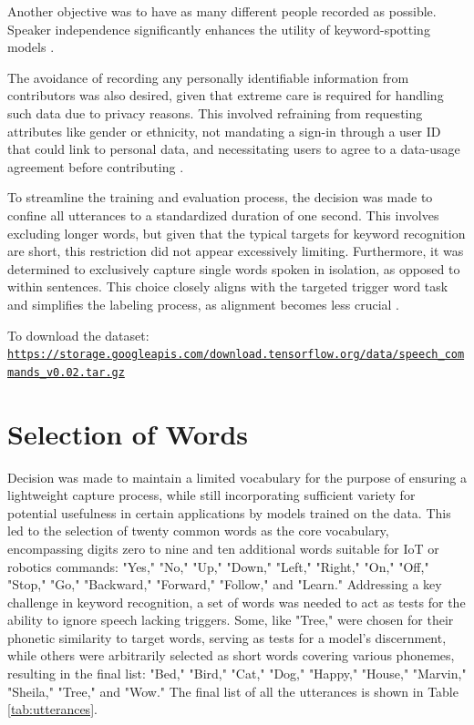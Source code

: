 Another objective was to have as many different people recorded as possible. Speaker independence significantly enhances the utility of keyword-spotting models \cite{Warden:2018}.

The avoidance of recording any personally identifiable information from contributors was also desired, given that extreme care is required for handling such data due to privacy reasons. This involved refraining from requesting attributes like gender or ethnicity, not mandating a sign-in through a user ID that could link to personal data, and necessitating users to agree to a data-usage agreement before contributing \cite{Warden:2018}.

To streamline the training and evaluation process, the decision was made to confine all utterances to a standardized duration of one second. This involves excluding longer words, but given that the typical targets for keyword recognition are short, this restriction did not appear excessively limiting. Furthermore, it was determined to exclusively capture single words spoken in isolation, as opposed to within sentences. This choice closely aligns with the targeted trigger word task and simplifies the labeling process, as alignment becomes less crucial \cite{Warden:2018}.

To download the dataset: \texttt{\url{https://storage.googleapis.com/download.tensorflow.org/data/speech\_commands\_v0.02.tar.gz}}

\section{Selection of Words}

Decision was made to maintain a limited vocabulary for the purpose of ensuring a lightweight capture process, while still incorporating sufficient variety for potential usefulness in certain applications by models trained on the data. This led to the selection of twenty common words as the core vocabulary, encompassing digits zero to nine and ten additional words suitable for IoT or robotics commands: "Yes," "No," "Up," "Down," "Left," "Right," "On," "Off," "Stop," "Go," "Backward," "Forward," "Follow," and "Learn." Addressing a key challenge in keyword recognition, a set of words was needed to act as tests for the ability to ignore speech lacking triggers. Some, like "Tree," were chosen for their phonetic similarity to target words, serving as tests for a model's discernment, while others were arbitrarily selected as short words covering various phonemes, resulting in the final list: "Bed," "Bird," "Cat," "Dog," "Happy," "House," "Marvin," "Sheila," "Tree," and "Wow." The final list of all the utterances is shown in Table \ref{tab:utterances}.

